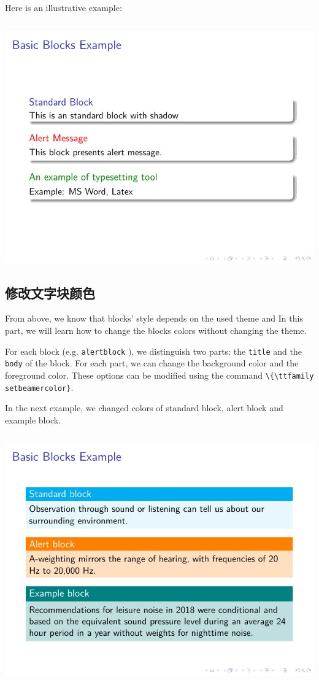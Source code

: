 Here is an illustrative example:

\inputminted[linenos=true]{latex}{examples/beamer/block-shapes.tex}

\includegraphics{examples/beamer/block-shapes.pdf}

\subsection{修改文字块颜色}

From above, we know that blocks’ style depends on the used theme and In this part, we will learn how to change the blocks colors without changing the theme.

For each block (e.g. \verb|alertblock| ), we distinguish two parts: the \verb|title| and the \verb|body| of the block. For each part, we can change the background color and the foreground color. These options can be modified using the command \verb|\{\ttfamily setbeamercolor}|.

In the next example, we changed colors of standard block, alert block and example block. 

\inputminted[linenos=true]{latex}{examples/beamer/block-change-colors.tex}

\includegraphics{examples/beamer/block-change-colors.pdf}

